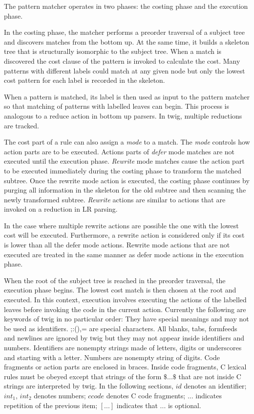 The pattern matcher operates in two phases: the costing phase and the execution
phase.

In the costing phase, the matcher performs a preorder traversal of
a subject tree and discovers matches from the bottom up.  At the same time, it
builds a skeleton tree that is structurally isomorphic to the subject tree.
When a match is discovered the cost clause of the pattern is invoked to
calculate the cost.  Many patterns with different labels could match at any
given node but only the lowest cost pattern for each label is recorded in
the skeleton.

When a pattern is matched, its label is then used as input to the pattern
matcher so that matching of patterns with labelled leaves can begin.
This
process
is analogous to a reduce action in
bottom up parsers.  In twig, multiple reductions are
tracked.

The cost part of a rule can also assign a {\sl mode} to a match.  The {\sl
mode} controls how action parts are to be executed.
Actions parts of {\sl defer} mode matches are not executed until the
execution phase.  {\sl Rewrite} mode matches cause the action part to
be executed immediately during the costing phase to transform the
matched subtree.  Once the rewrite mode action is executed, the costing
phase continues by purging all information in the skeleton for the old
subtree and then scanning the newly transformed subtree.  {\sl
Rewrite} actions are similar to actions that are invoked on a reduction in
LR parsing.

In the case where multiple rewrite actions are possible the one with
the lowest cost will be executed.  Furthermore, a rewrite action is
considered only if its cost is lower than all the defer mode actions.
Rewrite mode actions that are not executed are treated in the same
manner as defer mode actions in the execution phase.

When the root of the subject tree is reached in the preorder
traversal, the execution phase begins.  The lowest cost match is then
chosen at the root and executed.  In this context, execution involves
executing the actions of the labelled leaves before invoking the code
in the current action.
\medskip
{}
Currently the
following are keywords of twig in no particular order:
\medskip
{}
\medskip
\noindent  They have special meanings and may not be used as
identifiers.
;:(),= are special characters.  All blanks, tabs, formfeeds and
newlines are ignored by twig but they may not appear inside
identifiers and numbers.  Identifiers are nonempty strings
made of letters, digits or underscores and starting with a letter.
Numbers are nonempty string of digits.  Code fragments or action parts
are enclosed in braces.  Inside code fragments, C lexical rules must
be obeyed except that strings of the form $\$...\$$ that are not inside C
strings are interpreted by twig.  In the following sections, $id$
denotes an identifier; $int_1$, $int_2$ denotes numbers; $ccode$
denotes C code fragments; $...$ indicates repetition of the previous
item; $[...]$ indicates that $...$ is optional.

